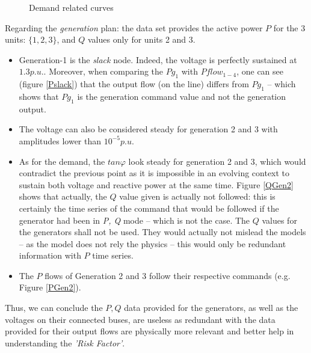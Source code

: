 \documentclass[11pt]{article}
\begin{document}
    
    \begin{figure}[H]
        \begin{subfigure}[t]{.4\textwidth}
            \centering
            
        \end{subfigure}\hspace{0.1\textwidth}
        \begin{subfigure}[t]{.4\textwidth}
            \centering
            
        \end{subfigure}
        \caption{\label{Demand}Demand related curves}
    \end{figure}


    Regarding the \emph{generation} plan: the data set provides the active power $P$ for the 3 units: $\{1, 2, 3\}$, and $Q$ values only for units 2 and 3.
    \begin{itemize}
        \item Generation-1 is the \emph{slack} node. Indeed, the voltage is perfectly sustained at $1.3 p.u.$. Moreover, when comparing the ${Pg}_1$ with ${Pflow}_{1-4}$, one can see (figure \ref{Pslack}) that the output flow (on the line) differs from ${Pg}_1$ -- which shows that ${Pg}_1$ is the generation command value and not the generation output.
        \item The voltage can also be considered steady for generation 2 and 3 with amplitudes lower than $10^{-5}p.u.$
        \item As for the demand, the $tan{\varphi}$ look steady for generation 2 and 3, which would contradict the previous point as it is impossible in an evolving context to sustain both voltage and reactive power at the same time. Figure \ref{QGen2} shows that actually, the $Q$ value given is actually not followed: this is certainly the time series of the command that would be followed if the generator had been in \emph{P, Q} mode -- which is not the case. The $Q$ values for the generators shall not be used. They would actually not mislead the models -- as the model does not rely the physics -- this would only be redundant information with $P$ time series.
        \item The $P$ flows of Generation 2 and 3 follow their respective commands (e.g. Figure \ref{PGen2}).
    \end{itemize}
    Thus, we can conclude the $P,Q$ data provided for the generators, as well as the voltages on their connected buses, are useless as redundant with the data provided for their output flows are physically more relevant and better help in understanding the \emph{'Risk Factor'}.
    
\end{document}
